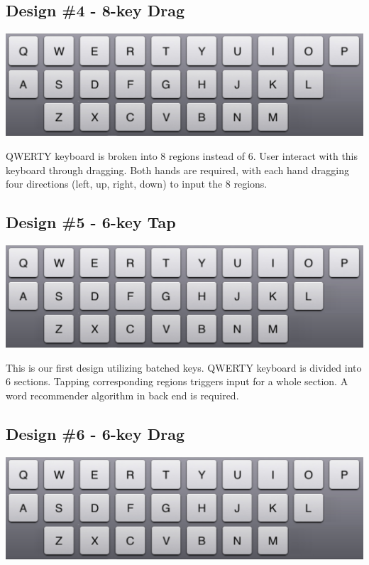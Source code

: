 \documentclass{sigchi}
\begin{document}
\subsection{Design \#4 - 8-key Drag}
\vspace*{.1cm}
\includegraphics[width=.9\columnwidth]{figures/26Tap}

QWERTY keyboard is broken into 8 regions instead of 6.
User interact with this keyboard through dragging.
Both hands are required, with each hand dragging four directions (left, up, right, down) to input the 8 regions.

\subsection{Design \#5 - 6-key Tap}
\vspace*{.1cm}
\includegraphics[width=.9\columnwidth]{figures/26Tap}

This is our first design utilizing batched keys. QWERTY keyboard is divided into 6 sections. Tapping corresponding regions triggers input for a whole section.
A word recommender algorithm in back end is required.


\subsection{Design \#6 - 6-key Drag}
\vspace*{.1cm}
\includegraphics[width=.9\columnwidth]{figures/26Tap}
\end{document}
